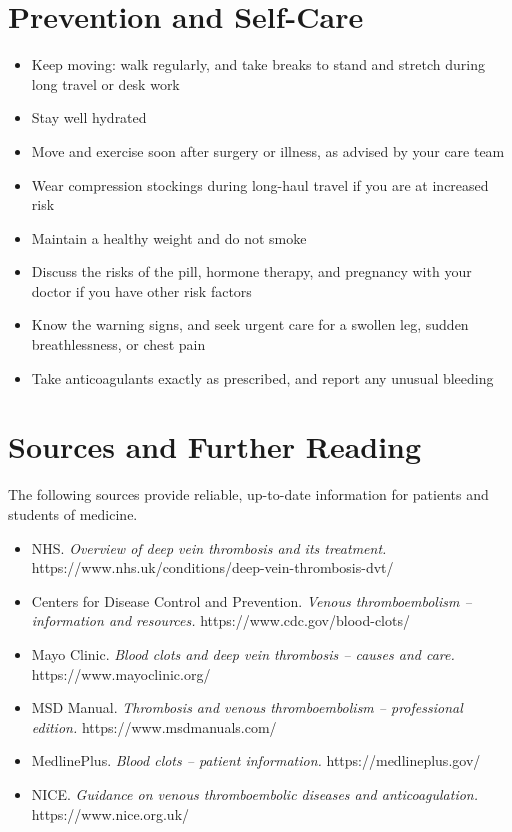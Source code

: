 \section*{Prevention and Self-Care}
\begin{itemize}
    \item Keep moving: walk regularly, and take breaks to stand and stretch during long travel or desk work
    \item Stay well hydrated
    \item Move and exercise soon after surgery or illness, as advised by your care team
    \item Wear compression stockings during long-haul travel if you are at increased risk
    \item Maintain a healthy weight and do not smoke
    \item Discuss the risks of the pill, hormone therapy, and pregnancy with your doctor if you have other risk factors
    \item Know the warning signs, and seek urgent care for a swollen leg, sudden breathlessness, or chest pain
    \item Take anticoagulants exactly as prescribed, and report any unusual bleeding
\end{itemize}

\section*{Sources and Further Reading}
The following sources provide reliable, up-to-date information for patients and students of medicine.

\begin{itemize}
    \item NHS. \textit{Overview of deep vein thrombosis and its treatment.} https://www.nhs.uk/conditions/deep-vein-thrombosis-dvt/
    \item Centers for Disease Control and Prevention. \textit{Venous thromboembolism -- information and resources.} https://www.cdc.gov/blood-clots/
    \item Mayo Clinic. \textit{Blood clots and deep vein thrombosis -- causes and care.} https://www.mayoclinic.org/
    \item MSD Manual. \textit{Thrombosis and venous thromboembolism -- professional edition.} https://www.msdmanuals.com/
    \item MedlinePlus. \textit{Blood clots -- patient information.} https://medlineplus.gov/
    \item NICE. \textit{Guidance on venous thromboembolic diseases and anticoagulation.} https://www.nice.org.uk/
\end{itemize}

